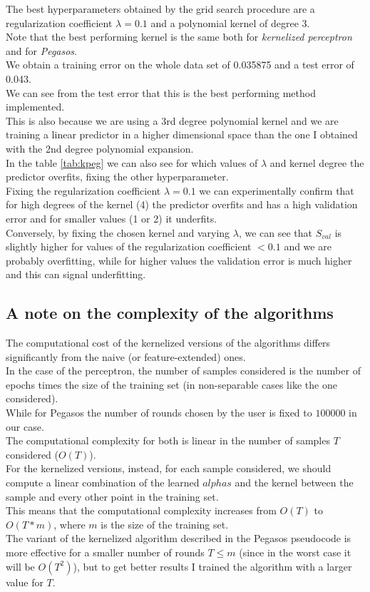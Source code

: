 The best hyperparameters obtained by the grid search procedure are a regularization coefficient $\lambda = 0.1$ and a polynomial kernel of degree 3.\\
Note that the best performing kernel is the same both for \textit{kernelized perceptron} and for \textit{Pegasos}.\\ 
We obtain a training error on the whole data set of 0.035875 and a test error of 0.043.\\
We can see from the test error that this is the best performing method implemented.\\
This is also because we are using a 3rd degree polynomial kernel and we are training a linear predictor in a higher dimensional space than the one I obtained with the 2nd degree polynomial expansion.\\
In the table \ref{tab:kpeg} we can also see for which values of $\lambda$ and kernel degree the predictor overfits, fixing the other hyperparameter.\\
Fixing the regularization coefficient $\lambda = 0.1$ we can experimentally confirm that for high degrees of the kernel (4) the predictor overfits and has a high validation error and for smaller values (1 or 2) it underfits.\\
Conversely, by fixing the chosen kernel and varying $\lambda$, we can see that $S_{val}$ is slightly higher for values of the regularization coefficient $< 0.1$ and we are probably overfitting, while for higher values the validation error is much higher and this can signal underfitting.\\

\subsection{A note on the complexity of the algorithms}
The computational cost of the kernelized versions of the algorithms differs significantly from the naive (or feature-extended) ones.\\
In the case of the perceptron, the number of samples considered is the number of epochs times the size of the training set (in non-separable cases like the one considered).\\
While for Pegasos the number of rounds chosen by the user is fixed to $100000$ in our case.\\
The computational complexity for both is linear in the number of samples $T$ considered ($O(T)$).\\
For the kernelized versions, instead, for each sample considered, we should compute a linear combination of the learned $alphas$ and the kernel between the sample and every other point in the training set.\\
This means that the computational complexity increases from $O(T)$ to $O(T * m)$, where $m$ is the size of the training set.\\
The variant of the kernelized algorithm described in the Pegasos pseudocode is more effective for a smaller number of rounds $T \leq m$ (since in the worst case it will be $O(T^2)$), but to get better results I trained the algorithm with a larger value for $T$.\\